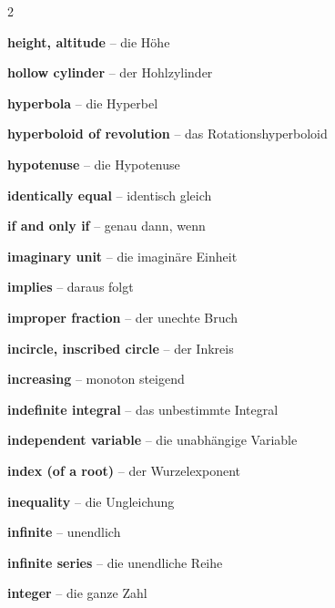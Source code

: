 \begin{multicols}{2}
\par\nopagebreak
\textbf{height, altitude} -- die Höhe\dotfill\hyperref[e:191]{\pageref*{e:191}}\par
\textbf{hollow cylinder} -- der Hohlzylinder\dotfill\hyperref[e:237]{\pageref*{e:237}}\par
\textbf{hyperbola} -- die Hyperbel\dotfill\hyperref[e:315]{\pageref*{e:315}}\par
\textbf{hyperboloid of revolution} -- das Rotationshyperboloid\dotfill\hyperref[e:244]{\pageref*{e:244}}\par
\textbf{hypotenuse} -- die Hypotenuse\dotfill\hyperref[e:186]{\pageref*{e:186}}\par

\par\nopagebreak
\textbf{identically equal} -- identisch gleich\dotfill\hyperref[e:62]{\pageref*{e:62}}\par
\textbf{if and only if} -- genau dann, wenn\dotfill\hyperref[e:351]{\pageref*{e:351}}\par
\textbf{imaginary unit} -- die imaginäre Einheit\dotfill\hyperref[e:11]{\pageref*{e:11}}\par
\textbf{implies} -- daraus folgt\dotfill\hyperref[e:350]{\pageref*{e:350}}\par
\textbf{improper fraction} -- der unechte Bruch\dotfill\hyperref[e:32]{\pageref*{e:32}}\par
\textbf{incircle, inscribed circle} -- der Inkreis\dotfill\hyperref[e:193]{\pageref*{e:193}}\par
\textbf{increasing} -- monoton steigend\dotfill\hyperref[e:142]{\pageref*{e:142}}\par
\textbf{indefinite integral} -- das unbestimmte Integral\dotfill\hyperref[e:287]{\pageref*{e:287}}\par
\textbf{independent variable} -- die unabhängige Variable\dotfill\hyperref[e:106]{\pageref*{e:106}}\par
\textbf{index (of a root)} -- der Wurzelexponent\dotfill\hyperref[e:49]{\pageref*{e:49}}\par
\textbf{inequality} -- die Ungleichung\dotfill\hyperref[e:77]{\pageref*{e:77}}\par
\textbf{infinite} -- unendlich\dotfill\hyperref[e:70]{\pageref*{e:70}}\par
\textbf{infinite series} -- die unendliche Reihe\dotfill\hyperref[e:266]{\pageref*{e:266}}\par
\textbf{integer} -- die ganze Zahl\dotfill\hyperref[e:6]{\pageref*{e:6}}\par

\end{multicols}
